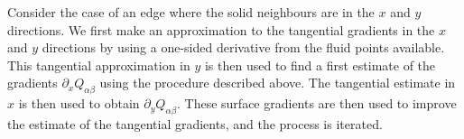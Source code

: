 Consider the case of an edge where the solid neighbours
are in the $x$ and $y$ directions.  We first make an approximation
to the tangential gradients in the $x$ and $y$ directions by using
a one-sided derivative from the fluid points available. This
tangential approximation in $y$ is then used to find a first
estimate of the gradients $\partial_x Q_{\alpha\beta}$ using the
procedure described above. The tangential estimate in $x$ is then
used to obtain $\partial_y Q_{\alpha\beta}$. These surface gradients
are then used to improve the estimate of the tangential gradients,
and the process is iterated.

{\small
\begin{table}
\begin{center}

\begin{tabular}{|c|cccccc|}


\end{tabular}
\end{center}
\end{table}}
